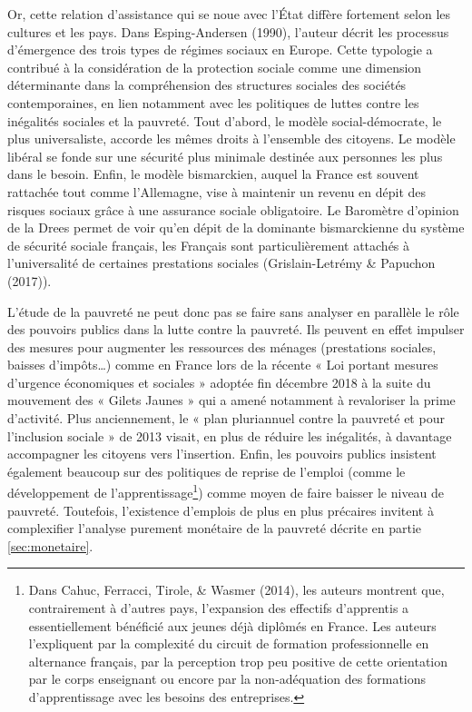 \documentclass[12pt,a4paper]{reedthesis}
\begin{document}
Or, cette relation d'assistance qui se noue avec l'État diffère fortement selon les cultures et les pays. Dans Esping-Andersen (1990), l'auteur décrit les processus d'émergence des trois types de régimes sociaux en Europe. Cette typologie a contribué à la considération de la protection sociale comme une dimension déterminante dans la compréhension des structures sociales des sociétés contemporaines, en lien notamment avec les politiques de luttes contre les inégalités sociales et la pauvreté. Tout d'abord, le modèle social-démocrate, le plus universaliste, accorde les mêmes droits à l'ensemble des citoyens. Le modèle libéral se fonde sur une sécurité plus minimale destinée aux personnes les plus dans le besoin. Enfin, le modèle bismarckien, auquel la France est souvent rattachée tout comme l'Allemagne, vise à maintenir un revenu en dépit des risques sociaux grâce à une assurance sociale obligatoire. Le Baromètre d'opinion de la Drees permet de voir qu'en dépit de la dominante bismarckienne du système de sécurité sociale français, les Français sont particulièrement attachés à l'universalité de certaines prestations sociales (Grislain-Letrémy \& Papuchon (2017)).

L'étude de la pauvreté ne peut donc pas se faire sans analyser en parallèle le rôle des pouvoirs publics dans la lutte contre la pauvreté. Ils peuvent en effet impulser des mesures pour augmenter les ressources des ménages (prestations sociales, baisses d'impôts\ldots) comme en France lors de la récente « Loi portant mesures d'urgence économiques et sociales » adoptée fin décembre 2018 à la suite du mouvement des « Gilets Jaunes » qui a amené notamment à revaloriser la prime d'activité. Plus anciennement, le « plan pluriannuel contre la pauvreté et pour l'inclusion sociale » de 2013 visait, en plus de réduire les inégalités, à davantage accompagner les citoyens vers l'insertion. Enfin, les pouvoirs publics insistent également beaucoup sur des politiques de reprise de l'emploi (comme le développement de l'apprentissage\footnote{Dans Cahuc, Ferracci, Tirole, \& Wasmer (2014), les auteurs montrent que, contrairement à d'autres pays, l'expansion des effectifs d'apprentis a essentiellement bénéficié aux jeunes déjà diplômés en France. Les auteurs l'expliquent par la complexité du circuit de formation professionnelle en alternance français, par la perception trop peu positive de cette orientation par le corps enseignant ou encore par la non-adéquation des formations d'apprentissage avec les besoins des entreprises.}) comme moyen de faire baisser le niveau de pauvreté. Toutefois, l'existence d'emplois de plus en plus précaires invitent à complexifier l'analyse purement monétaire de la pauvreté décrite en partie \ref{sec:monetaire}.
\end{document}
